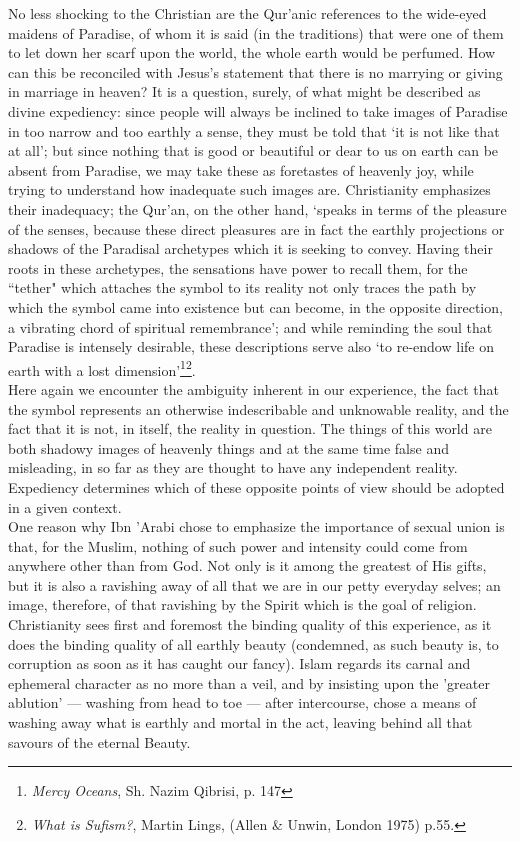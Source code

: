 \documentclass[10pt, twoside,openright]{book}
\begin{document}
No less shocking to the Christian are the Qur'anic references to the wide\hyp{}eyed maidens of Paradise, 
of whom it is said (in the traditions) that were one of them to let down her scarf upon the world, 
the whole earth would be perfumed. How can this be reconciled with Jesus's statement that there is no 
marrying or giving in marriage in heaven? It is a question, surely, of what might be described as 
divine expediency: since people will always be inclined to take images of Paradise in too narrow and 
too earthly a sense, they must be told that `it is not like that at all'; but since nothing that is 
good or beautiful or dear to us on earth can be absent from Paradise, we may take these as foretastes 
of heavenly joy, while trying to understand how inadequate such images are. Christianity emphasizes 
their inadequacy; the Qur'an, on the other hand, `speaks in terms of the pleasure of the senses, 
because these direct pleasures are in fact the earthly projections or shadows of the Paradisal 
archetypes which it is seeking to convey. Having their roots in these archetypes, the sensations have 
power to recall them, for the ``tether" which attaches the symbol to its reality not only traces the 
path by which the symbol came into existence but can become, in the opposite direction, a vibrating 
chord of spiritual remembrance'; and while reminding the soul that Paradise is intensely desirable, 
these descriptions serve also `to re\hyp{}endow life on earth with a lost dimension'\footnote{\emph{Mercy Oceans}, Sh. Nazim Qibrisi, p. 147}\footnote{\emph{What is Sufism?}, Martin Lings, (Allen \& Unwin, London 1975) p.55.}. \\

Here again we encounter the ambiguity inherent in our experience, the fact that the symbol represents 
an otherwise indescribable and unknowable reality, and the fact that it is not, in itself, the 
reality in question. The things of this world are both shadowy images of heavenly things and at the 
same time false and misleading, in so far as they are thought to have any independent reality. 
Expediency determines which of these opposite points of view should be adopted in a given context. \\

One reason why Ibn 'Arabi chose to emphasize the importance of sexual union is that, for the Muslim, 
nothing of such power and intensity could come from anywhere other than from God. Not only is it 
among the greatest of His gifts, but it is also a ravishing away of all that we are in our petty 
everyday selves; an image, therefore, of that ravishing by the Spirit which is the goal of religion. 
Christianity sees first and foremost the binding quality of this experience, as it does the binding 
quality of all earthly beauty (condemned, as such beauty is, to corruption as soon as it has caught 
our fancy). Islam regards its carnal and ephemeral character as no more than a veil, and by insisting 
upon the 'greater ablution' --- washing from head to toe --- after intercourse, chose a means of washing 
away what is earthly and mortal in the act, leaving behind all that savours of the eternal Beauty. \\
\end{document}

